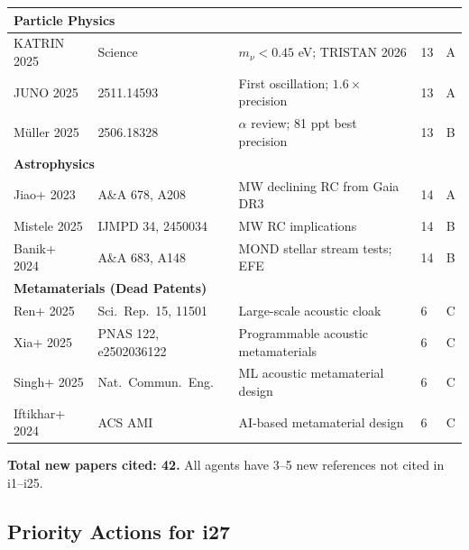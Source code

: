 \documentclass[11pt,a4paper]{article}
\begin{document}
\begin{longtable}{p{2.5cm}p{2.5cm}p{4.5cm}p{1.5cm}c}
\multicolumn{5}{l}{\textbf{Particle Physics}} \\
\midrule
KATRIN 2025 & Science & $m_\nu < 0.45$ eV; TRISTAN 2026 & 13 & A \\
JUNO 2025 & 2511.14593 & First oscillation; $1.6\times$ precision & 13 & A \\
M\"uller 2025 & 2506.18328 & $\alpha$ review; 81 ppt best precision & 13 & B \\
\midrule

\multicolumn{5}{l}{\textbf{Astrophysics}} \\
\midrule
Jiao+ 2023 & A\&A 678, A208 & MW declining RC from Gaia DR3 & 14 & A \\
Mistele 2025 & IJMPD 34, 2450034 & MW RC implications & 14 & B \\
Banik+ 2024 & A\&A 683, A148 & MOND stellar stream tests; EFE & 14 & B \\
\midrule

\multicolumn{5}{l}{\textbf{Metamaterials (Dead Patents)}} \\
\midrule
Ren+ 2025 & Sci.\ Rep.\ 15, 11501 & Large-scale acoustic cloak & 6 & C \\
Xia+ 2025 & PNAS 122, e2502036122 & Programmable acoustic metamaterials & 6 & C \\
Singh+ 2025 & Nat.\ Commun.\ Eng. & ML acoustic metamaterial design & 6 & C \\
Iftikhar+ 2024 & ACS AMI & AI-based metamaterial design & 6 & C \\
\bottomrule
\end{longtable}

\textbf{Total new papers cited: 42.} All agents have 3--5 new references not cited in i1--i25.

\subsection{Priority Actions for i27}
\end{document}
